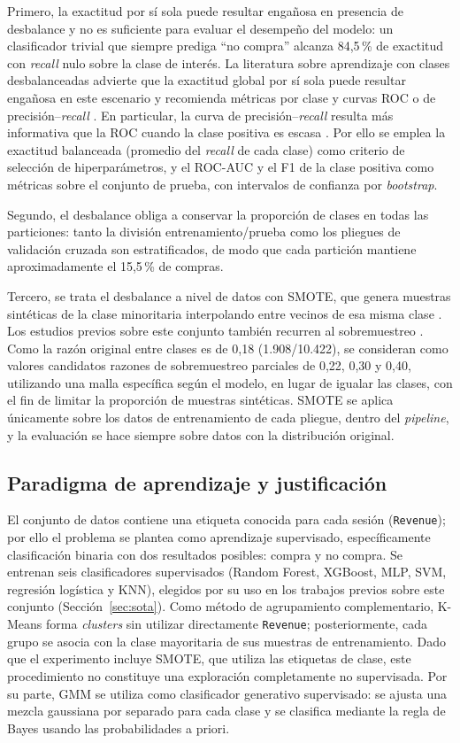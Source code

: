 \documentclass[conference]{IEEEtran}
\begin{document}
Primero, la exactitud por sí sola puede resultar engañosa en presencia de desbalance y no es suficiente para evaluar el desempeño del modelo: un clasificador trivial que siempre prediga ``no compra'' alcanza 84,5\,\% de exactitud con \emph{recall} nulo sobre la clase de interés. La literatura sobre aprendizaje con clases desbalanceadas advierte que la exactitud global por sí sola puede resultar engañosa en este escenario y recomienda métricas por clase y curvas ROC o de precisión--\emph{recall} \cite{he2009}. En particular, la curva de precisión--\emph{recall} resulta más informativa que la ROC cuando la clase positiva es escasa \cite{saito2015}. Por ello se emplea la exactitud balanceada (promedio del \emph{recall} de cada clase) como criterio de selección de hiperparámetros, y el ROC-AUC y el F1 de la clase positiva como métricas sobre el conjunto de prueba, con intervalos de confianza por \emph{bootstrap}.

Segundo, el desbalance obliga a conservar la proporción de clases en todas las particiones: tanto la división entrenamiento/prueba como los pliegues de validación cruzada son estratificados, de modo que cada partición mantiene aproximadamente el 15,5\,\% de compras.

Tercero, se trata el desbalance a nivel de datos con SMOTE, que genera muestras sintéticas de la clase minoritaria interpolando entre vecinos de esa misma clase \cite{chawla2002}. Los estudios previos sobre este conjunto también recurren al sobremuestreo \cite{sakar2019,tanvir2023,alamuri2026}. Como la razón original entre clases es de 0,18 (1.908/10.422), se consideran como valores candidatos razones de sobremuestreo parciales de 0,22, 0,30 y 0,40, utilizando una malla específica según el modelo, en lugar de igualar las clases, con el fin de limitar la proporción de muestras sintéticas. SMOTE se aplica únicamente sobre los datos de entrenamiento de cada pliegue, dentro del \emph{pipeline}, y la evaluación se hace siempre sobre datos con la distribución original.

\subsection{Paradigma de aprendizaje y justificación}
El conjunto de datos contiene una etiqueta conocida para cada sesión (\texttt{Revenue}); por ello el problema se plantea como aprendizaje supervisado, específicamente clasificación binaria con dos resultados posibles: compra y no compra. Se entrenan seis clasificadores supervisados (Random Forest, XGBoost, MLP, SVM, regresión logística y KNN), elegidos por su uso en los trabajos previos sobre este conjunto (Sección~\ref{sec:sota}). Como método de agrupamiento complementario, K-Means forma \emph{clusters} sin utilizar directamente \texttt{Revenue}; posteriormente, cada grupo se asocia con la clase mayoritaria de sus muestras de entrenamiento. Dado que el experimento incluye SMOTE, que utiliza las etiquetas de clase, este procedimiento no constituye una exploración completamente no supervisada. Por su parte, GMM se utiliza como clasificador generativo supervisado: se ajusta una mezcla gaussiana por separado para cada clase y se clasifica mediante la regla de Bayes usando las probabilidades a priori.
\end{document}

